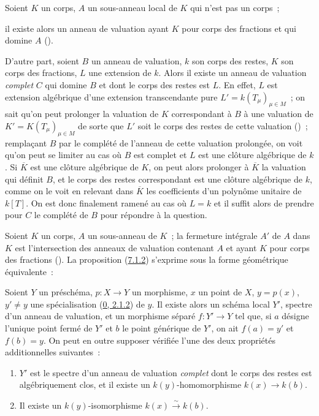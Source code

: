 \begin{env}[7.1.2]
\label{II.7.1.2-fr}
Soient $K$ un corps, $A$ un sous-anneau local de $K$ qui n'est pas un corps~;


il existe alors un anneau de valuation ayant $K$ pour corps des fractions et
qui domine $A$ (\cite[p.~1-07, lemme~2]{I-1}).

D'autre part, soient $B$ un anneau de valuation, $k$ son corps des restes,
$K$ son corps des fractions, $L$ une extension de $k$. Alors il existe un
anneau de valuation \emph{complet} $C$ qui domine $B$ et dont le corps des
restes est $L$. En effet, $L$ est extension algébrique d'une extension
transcendante pure $L'=k(T_\mu)_{\mu\in M}$~; on sait qu'on peut prolonger la
valuation de $K$ correspondant à $B$ à une valuation de
$K'=K(T_\mu)_{\mu\in M}$ de sorte que $L'$ soit le corps des restes de cette
valuation (\cite[p.~98]{II-24})~; remplaçant $B$ par le complété de l'anneau
de cette valuation prolongée, on voit qu'on peut se limiter au cas où $B$ est
complet et $L$ est une clôture algébrique de $k$. Si $\overline{K}$ est une
clôture algébrique de $K$, on peut alors prolonger à $\overline{K}$ la
valuation qui définit $B$, et le corps des restes correspondant est une
clôture algébrique de $k$, comme on le voit en relevant dans $\overline{K}$
les coefficients d'un polynôme unitaire de $k[T]$. On est donc finalement
ramené au cas où $L=k$ et il suffit alors de prendre pour $C$ le complété de
$B$ pour répondre à la question.
\end{env}

\begin{env}[7.1.3]
\label{II.7.1.3-fr}
Soient $K$ un corps, $A$ un sous-anneau de $K$~; la fermeture intégrale $A'$
de $A$ dans $K$ est l'intersection des anneaux de valuation contenant $A$ et
ayant $K$ pour corps des fractions
(\cite[p.~51, th.~2]{I-11}). La proposition
(\hyperref[II.7.1.2-fr]{7.1.2}) s'exprime sous la forme géométrique
équivalente~:
\end{env}

\begin{proposition}[7.1.4]
\label{II.7.1.4-fr}
Soient $Y$ un préschéma, $p:X\to Y$ un morphisme, $x$ un point de $X$,
$y=p(x)$, $y'\neq y$ une spécialisation
(\hyperref[0.2.1.2-fr]{0, 2.1.2}) de $y$. Il existe alors un schéma local
$Y'$, spectre d'un anneau de valuation, et un morphisme séparé $f:Y'\to Y$
tel que, si $a$ désigne l'unique point fermé de $Y'$ et $b$ le point
générique de $Y'$, on ait $f(a)=y'$ et $f(b)=y$. On peut en outre supposer
vérifiée l'une des deux propriétés additionnelles suivantes~:
\begin{enumerate}
\item[\rm{(i)}] $Y'$ est le spectre d'un anneau de valuation \emph{complet}
dont le corps des restes est algébriquement clos, et il existe un
$k(y)$-homomorphisme $k(x)\to k(b)$.
\item[\rm{(ii)}] Il existe un $k(y)$-isomorphisme
$k(x)\xrightarrow{\sim}k(b)$.
\end{enumerate}
\end{proposition}

